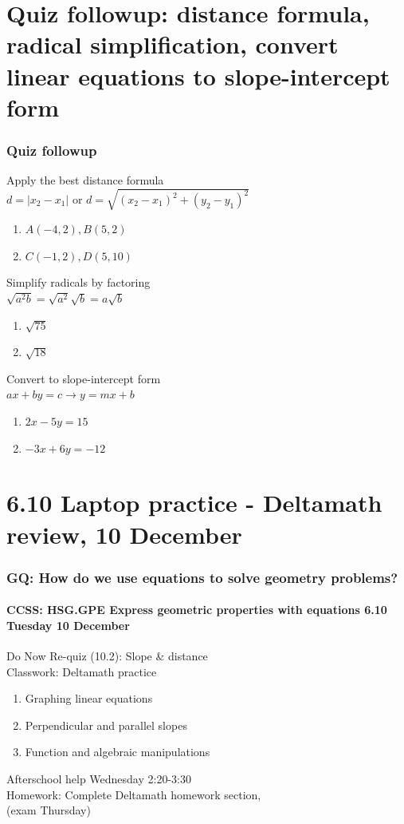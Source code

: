 \documentclass{beamer}
\begin{document}
\section{Quiz followup: distance formula, radical simplification, convert linear equations to slope-intercept form}
\frame
{
  \frametitle{Quiz followup}

  \begin{block}{Apply the best distance formula\\ \qquad $d=|x_2-x_1|$ \qquad or \qquad $\displaystyle d=\sqrt{(x_2-x_1)^2+(y_2-y_1)^2}$}
    \begin{enumerate}
      \item $A(-4,2),B(5,2)$
      \item $C(-1,2),D(5,10)$
    \end{enumerate}
    \end{block}
  \begin{block}{Simplify radicals by factoring\\[0.2cm] \qquad $\sqrt{a^2b}=\sqrt{a^2}\sqrt{b}=a\sqrt{b}$}
    \begin{enumerate}
      \item $\sqrt{75}$
      \item $\sqrt{18}$
    \end{enumerate}
    \end{block}
  \begin{block}{Convert to slope-intercept form\\\qquad $ax+by=c \rightarrow y=mx+b$}
    \begin{enumerate}
      \item $2x-5y=15$
      \item $-3x+6y=-12$
    \end{enumerate}
    \end{block}
}

\section{6.10 Laptop practice - Deltamath review, 10 December}
  \frame
  {
  \frametitle{GQ: How do we use equations to solve geometry problems?}
  \framesubtitle{CCSS: HSG.GPE Express geometric properties with equations \hfill \alert{6.10 Tuesday 10 December}}

  \begin{block}{Do Now Re-quiz (10.2): Slope \& distance \\[0.25cm] 
    Classwork: Deltamath practice}
  \begin{enumerate}
    \item Graphing linear equations
    \item Perpendicular and parallel slopes
    \item Function and algebraic manipulations
  \end{enumerate}
  \end{block}
  Afterschool help Wednesday 2:20-3:30\\[0.25cm]
  Homework: Complete Deltamath homework section, \\(\alert{exam Thursday})
  }
\end{document}
